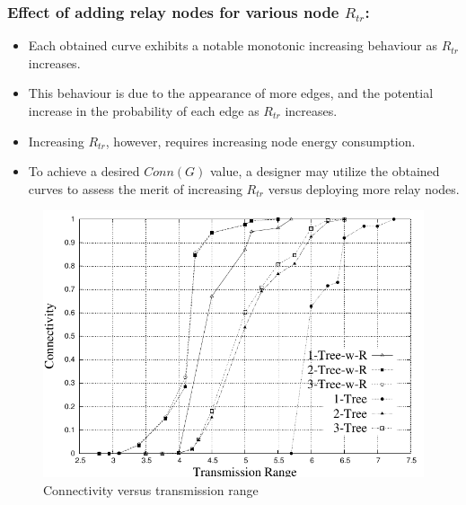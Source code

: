 \documentclass{beamer}
\begin{document}
\begin{frame}
\frametitle{Effect of adding relay nodes for various node $R_{tr}$:}
\begin{itemize}
\item Each obtained curve exhibits a notable monotonic increasing behaviour as $R_{tr}$ increases. 
\item This behaviour is due to the appearance of more edges, and the potential increase in the probability of each edge as $R_{tr}$ increases. 
\item Increasing $R_{tr}$, however, requires increasing node energy consumption.
\item  To achieve a desired $Conn(G)$ value, a designer may utilize the obtained curves to assess the merit of increasing $R_{tr}$ versus deploying more relay nodes.
\end{itemize}
\begin{figure}[!htb]
\begin{minipage}{.9\linewidth}
\end{minipage}
\includegraphics[width=4 in, height=1.35 in]{NetworkI_woR-eps-converted-to.pdf}
\caption{Connectivity versus transmission range}
\label{Fig:NWOR}
\end{figure}

\end{frame}
\end{document}
